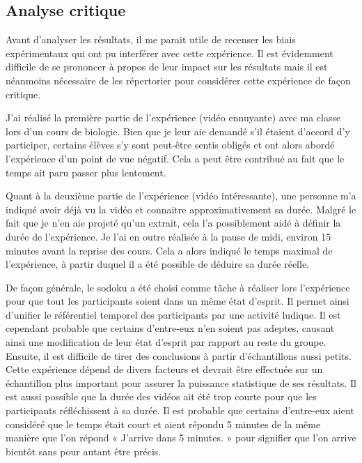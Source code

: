 \documentclass[12pt,fleqn,oneside,openany]{book} %
\begin{document}
\subsection{Analyse critique} \label{ssec:analyseCrit}
Avant d'analyser les résultats, il me parait utile de recenser les biais expérimentaux qui ont pu interférer avec cette expérience. Il est évidemment difficile de se prononcer à propos de leur impact sur les résultats mais il est néanmoins nécessaire de les répertorier pour considérer cette expérience de façon critique.

J'ai réalisé la première partie de l'expérience (vidéo ennuyante) avec ma classe lors d'un cours de biologie. Bien que je leur aie demandé s'il étaient d'accord d'y participer, certains élèves s'y sont peut-être sentis obligés et ont alors abordé l'expérience d'un point de vue négatif. Cela a peut être contribué au fait que le temps ait paru passer plus lentement.

Quant à la deuxième partie de l'expérience (vidéo intéressante), une personne m'a indiqué avoir déjà vu la vidéo et connaitre approximativement sa durée. Malgré le fait que je n'en aie projeté qu'un extrait, cela l'a possiblement aidé à définir la durée de l'expérience.
Je l'ai en outre réalisée à la pause de midi, environ 15 minutes avant la reprise des cours. Cela a alors indiqué le temps maximal de l'expérience, à partir duquel il a été possible de déduire sa durée réelle.

De façon générale, le sodoku a été choisi comme tâche à réaliser lors l'expérience pour que tout les participants soient dans un même état d'esprit. Il permet ainsi d'unifier le référentiel temporel des participants par une activité ludique. Il est cependant probable que certains d'entre-eux n'en soient pas adeptes, causant ainsi une modification de leur état d'esprit par rapport au reste du groupe.
Ensuite, il est difficile de tirer des conclusions à partir d'échantillons aussi petits. Cette expérience dépend de divers facteurs et devrait être effectuée sur un échantillon plus important pour assurer la puissance statistique de ses résultats.
Il est aussi possible que la durée des vidéos ait été trop courte pour que les participants réfléchissent à sa durée. Il est probable que certains d'entre-eux aient considéré que le temps était court et aient répondu 5 minutes de la même manière que l'on répond « J'arrive dans 5 minutes. » pour signifier que l'on arrive bientôt sans pour autant être précis. 

\end{document}
